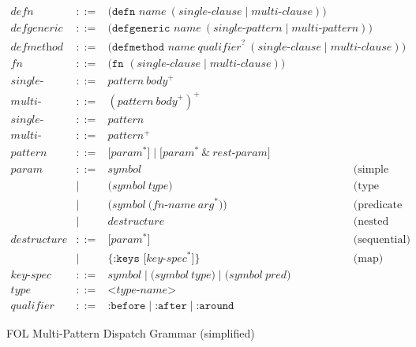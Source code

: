 \documentclass[sigconf,nonacm,review]{acmart}
\begin{document}
\begin{figure}[htbp]
\centering
$\begin{array}{rcll}
  \textit{defn} & ::= & \texttt{(defn } \textit{name} ~ (\textit{single-clause} \mid \textit{multi-clause}) \texttt{)} \\
  \textit{defgeneric} & ::= & \texttt{(defgeneric } \textit{name} ~ (\textit{single-pattern} \mid \textit{multi-pattern}) \texttt{)} \\
  \textit{defmethod} & ::= & \texttt{(defmethod } \textit{name} ~ \textit{qualifier}^? ~ (\textit{single-clause} \mid \textit{multi-clause}) \texttt{)} \\
  \textit{fn} & ::= & \texttt{(fn } (\textit{single-clause} \mid \textit{multi-clause}) \texttt{)} \\
  \textit{single-clause} & ::= & \textit{pattern} ~ \textit{body}^+ \\
  \textit{multi-clause} & ::= & (\textit{pattern} ~ \textit{body}^+)^+ \\
  \textit{single-pattern} & ::= & \textit{pattern} \\
  \textit{multi-pattern} & ::= & \textit{pattern}^+ \\
  \textit{pattern} & ::= & \texttt{[} \textit{param}^* \texttt{]} \mid \texttt{[} \textit{param}^* ~ \texttt{\&} ~ \textit{rest-param} \texttt{]} \\
  \textit{param} & ::= & \textit{symbol} & \text{(simple binding)} \\
                 & \mid & \texttt{(} \textit{symbol} ~ \textit{type} \texttt{)} & \text{(type specializer)} \\
                 & \mid & \texttt{(} \textit{symbol} ~ \texttt{(} \textit{fn-name} ~ \textit{arg}^* \texttt{)} \texttt{)} & \text{(predicate specializer)} \\
                 & \mid & \textit{destructure} & \text{(nested destructuring)} \\
  \textit{destructure} & ::= & \texttt{[} \textit{param}^* \texttt{]} & \text{(sequential)} \\
                 & \mid & \texttt{\{} \texttt{:keys~[} \textit{key-spec}^* \texttt{]} \texttt{\}} & \text{(map)} \\
  \textit{key-spec} & ::= & \textit{symbol} \mid \texttt{(} \textit{symbol} ~ \textit{type} \texttt{)} \mid \texttt{(} \textit{symbol} ~ \textit{pred} \texttt{)} \\
  \textit{type} & ::= & \texttt{<}\textit{type-name}\texttt{>} \\
  \textit{qualifier} & ::= & \texttt{:before} \mid \texttt{:after} \mid \texttt{:around}
\end{array}$
\caption{FOL Multi-Pattern Dispatch Grammar (simplified)}
\label{fig:grammar}
\end{figure}
\end{document}
